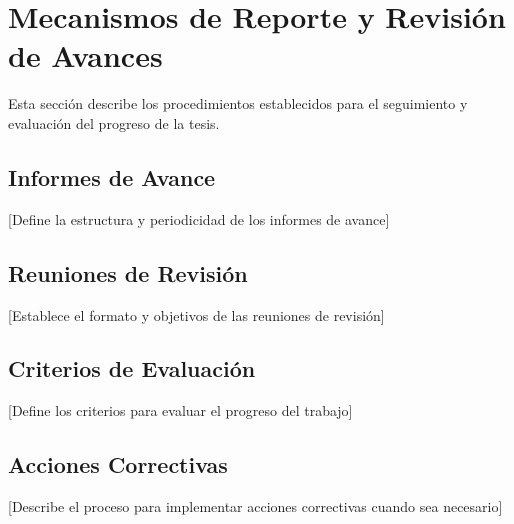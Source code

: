 \section{Mecanismos de Reporte y Revisión de Avances}

Esta sección describe los procedimientos establecidos para el seguimiento y evaluación del progreso de la tesis.

\subsection{Informes de Avance}
[Define la estructura y periodicidad de los informes de avance]

\subsection{Reuniones de Revisión}
[Establece el formato y objetivos de las reuniones de revisión]

\subsection{Criterios de Evaluación}
[Define los criterios para evaluar el progreso del trabajo]

\subsection{Acciones Correctivas}
[Describe el proceso para implementar acciones correctivas cuando sea necesario]